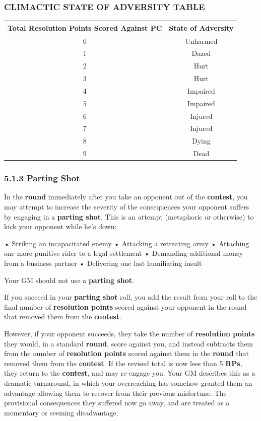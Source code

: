 \documentclass[
]{article}
\begin{document}
\hypertarget{climactic-state-of-adversity-table}{%
\subsubsection{CLIMACTIC STATE OF ADVERSITY
TABLE}\label{climactic-state-of-adversity-table}}

\begin{longtable}[]{@{}cc@{}}
\toprule
Total Resolution Points Scored Against PC & State of
Adversity\tabularnewline
\midrule
\endhead
0 & Unharmed\tabularnewline
1 & Dazed\tabularnewline
2 & Hurt\tabularnewline
3 & Hurt\tabularnewline
4 & Impaired\tabularnewline
5 & Impaired\tabularnewline
6 & Injured\tabularnewline
7 & Injured\tabularnewline
8 & Dying\tabularnewline
9 & Dead\tabularnewline
\bottomrule
\end{longtable}

\hypertarget{parting-shot}{%
\subsubsection{5.1.3 Parting Shot}\label{parting-shot}}

In the \textbf{round} immediately after you take an opponent out of the
\textbf{contest}, you may attempt to increase the severity of the
consequences your opponent suffers by engaging in a \textbf{parting
shot}. This is an attempt (metaphoric or otherwise) to kick your
opponent while he's down:

• Striking an incapacitated enemy • Attacking a retreating army •
Attaching one more punitive rider to a legal settlement • Demanding
additional money from a business partner • Delivering one last
humiliating insult

Your GM should not use a \textbf{parting shot}.

If you succeed in your \textbf{parting shot} roll, you add the result
from your roll to the final number of \textbf{resolution points} scored
against your opponent in the round that removed them from the
\textbf{contest}.

However, if your opponent succeeds, they take the number of
\textbf{resolution points} they would, in a standard \textbf{round},
score against you, and instead subtracts them from the number of
\textbf{resolution points} scored against them in the \textbf{round}
that removed them from the \textbf{contest}. If the revised total is now
less than 5 \textbf{RPs}, they return to the \textbf{contest}, and may
re-engage you. Your GM describes this as a dramatic turnaround, in which
your overreaching has somehow granted them an advantage allowing them to
recover from their previous misfortune. The provisional consequences
they suffered now go away, and are treated as a momentary or seeming
disadvantage.
\end{document}
